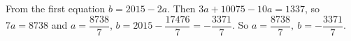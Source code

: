 From the first equation $b=2015-2a$. Then $3a+10075-10a=1337$, so $7a=8738$ and $a=\dfrac{8738}{7}$, $b=2015-\dfrac{17476}{7}=-\dfrac{3371}{7}$. So $\boxed{a=\dfrac{8738}{7},\ b=-\dfrac{3371}{7}}$.
